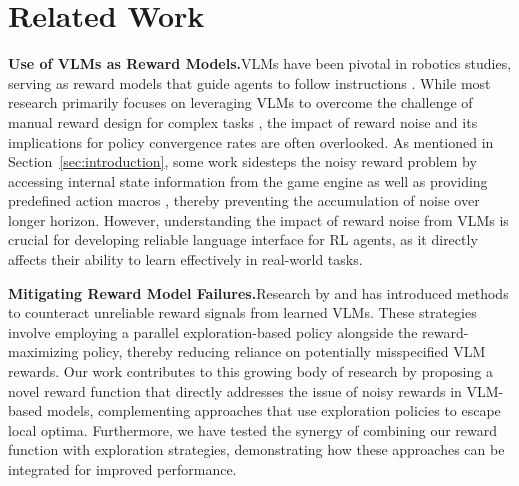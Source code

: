 \documentclass{article}
\theoremstyle{plain}
\theoremstyle{definition}
\theoremstyle{remark}
\begin{document}
\section{Related Work}
\noindent \textbf{Use of VLMs as Reward Models.}\quad VLMs have been pivotal in robotics studies, serving as reward models that guide agents to follow instructions \citep{Wang2018ReinforcedCM, Shridhar2021CLIPortWA, Mahmoudieh2022ZeroShotRS}. While most research primarily focuses on leveraging VLMs to overcome the challenge of manual reward design for complex tasks \citep{openai_faulty_rewards2016}, the impact of reward noise and its implications for policy convergence rates are often overlooked. As mentioned in Section~\ref{sec:introduction}, some work sidesteps the noisy reward problem by accessing internal state information from the game engine as well as providing predefined action macros \citep{du2023guiding, Wang2023DescribeEP}, thereby preventing the accumulation of noise over longer horizon. However, understanding the impact of reward noise from VLMs is crucial for developing reliable language interface for RL agents, as it directly affects their ability to learn effectively in real-world tasks.



\noindent \textbf{Mitigating Reward Model Failures.}\quad Research by \citet{Ghosal2022TheEO} and \citet{fufurl2024} has introduced methods to counteract unreliable reward signals from learned VLMs. These strategies involve employing a parallel exploration-based policy alongside the reward-maximizing policy, thereby reducing reliance on potentially misspecified VLM rewards. Our work contributes to this growing body of research by proposing a novel reward function that directly addresses the issue of noisy rewards in VLM-based models, complementing approaches that use exploration policies to escape local optima. Furthermore, we have tested the synergy of combining our reward function with exploration strategies, demonstrating how these approaches can be integrated for improved performance.
\end{document}
